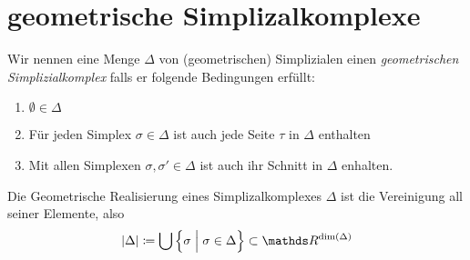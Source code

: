 
\section{geometrische Simplizalkomplexe}

\begin{Def}
	Wir nennen eine Menge $\Delta$ von (geometrischen) Simplizialen einen \textit{geometrischen Simplizialkomplex}
	falls er folgende Bedingungen erfüllt:
	\begin{enumerate}[(K1)]
		\item $\emptyset \in \Delta$
		\item Für jeden Simplex $\sigma \in \Delta$ ist auch jede Seite
		$\tau$ in $\Delta$ enthalten
		\item Mit allen Simplexen $\sigma, \sigma' \in \Delta$ ist auch ihr
		Schnitt in $\Delta$ enhalten.
	\end{enumerate}
\end{Def}


\begin{Def}
	Die Geometrische Realisierung eines Simplizalkomplexes $\Delta$ ist
	die Vereinigung all seiner Elemente, also
	\begin{gather*}
	|\Delta| \coloneqq \bigcup \left\{ \sigma \; \Big| \; \sigma \in
	\Delta \right\} \subset \R^{\dim(\Delta)}
	\end{gather*}
\end{Def}








